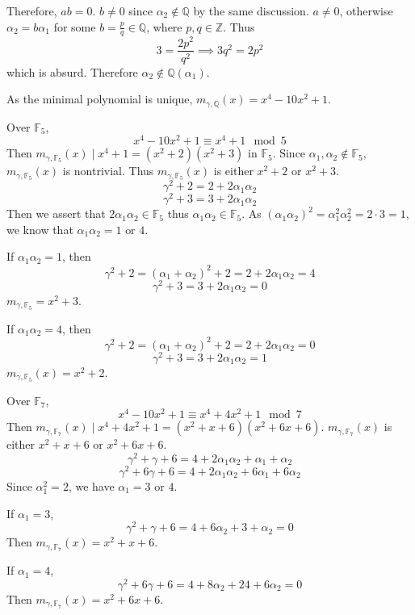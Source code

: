 Therefore, $ab=0$. $b\neq0$ since $\alpha_2 \not\in \mathbb{Q}$ by the same discussion. $a\neq0$, otherwise $\alpha_2=b\alpha_1$ for some $b=\frac{p}{q}\in \mathbb{Q}$, where $p, q\in \mathbb{Z}$. Thus
\[
3=\frac{2p^2}{q^2}\implies 3q^2=2p^2
\]
which is absurd. Therefore $\alpha_2 \not\in \mathbb{Q}(\alpha_1)$.

As the minimal polynomial is unique, $m_{\gamma,\mathbb{Q}}(x)=x^{4}-10x^2+1$.

Over $\mathbb{F}_{5}$,
\[
x^{4}-10x^2+1\equiv x^{4}+1\mod 5
\]
Then $m_{\gamma,\mathbb{F}_{5}}(x)\mid x^{4}+1=(x^2+2)(x^2+3)$ in $\mathbb{F}_{5}$. Since $\alpha_1,\alpha_2 \not\in \mathbb{F}_{5}$, $m_{\gamma,\mathbb{F}_{5}}(x)$ is nontrivial. Thus $m_{\gamma,\mathbb{F}_{5}}(x)$ is either $x^2+2$ or $x^2+3$.
\[
\gamma^{2}+2=2+2\alpha_1\alpha_2
\]
\[
\gamma^{2}+3=3+2\alpha_1\alpha_2
\]
Then we assert that $2\alpha_1\alpha_2\in \mathbb{F}_{5}$ thus $\alpha_1\alpha_2\in \mathbb{F}_{5}$. As $(\alpha_1\alpha_2)^2=\alpha_1^2\alpha_2^2=2\cdot3=1$, we know that $\alpha_1\alpha_2=1\text{ or }4$.

If $\alpha_1\alpha_2=1$, then
\[
\gamma^{2}+2=(\alpha_1+\alpha_2)^2+2=2+2\alpha_1\alpha_2=4
\]
\[
\gamma^{2}+3=3+2\alpha_1\alpha_2=0
\]
$m_{\gamma,\mathbb{F}_{5}}=x^2+3$.

If $\alpha_1\alpha_2=4$, then
\[
\gamma^{2}+2=(\alpha_1+\alpha_2)^2+2=2+2\alpha_1\alpha_2=0
\]
\[
\gamma^{2}+3=3+2\alpha_1\alpha_2=1
\]
$m_{\gamma,\mathbb{F}_{5}}(x)=x^2+2$.

Over $\mathbb{F}_{7}$,
\[
x^{4}-10x^2+1\equiv x^{4}+4x^2+1\mod 7
\]
Then $m_{\gamma,\mathbb{F}_{7}}(x)\mid x^{4}+4x^2+1=(x^2+x+6)(x^2+6x+6)$. $m_{\gamma,\mathbb{F}_{7}}(x)$ is either $x^2+x+6$ or $x^2+6x+6$.
\[
\gamma^{2}+\gamma+6=4+2\alpha_1\alpha_2+\alpha_1+\alpha_2
\]
\[
\gamma^{2}+6\gamma+6=4+2\alpha_1\alpha_2+6\alpha_1+6\alpha_2
\]
Since $\alpha_1^2=2$, we have $\alpha_1=3\text{ or }4$.

If $\alpha_1=3$,
\[
\gamma^{2}+\gamma+6=4+6\alpha_2+3+\alpha_2=0
\]
Then $m_{\gamma,\mathbb{F}_{7}}(x)=x^2+x+6$.

If $\alpha_1=4$,
\[
\gamma^{2}+6\gamma+6=4+8\alpha_2+24+6\alpha_2=0
\]
Then $m_{\gamma,\mathbb{F}_{7}}(x)=x^2+6x+6$.

